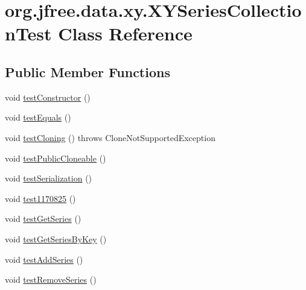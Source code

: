 \hypertarget{classorg_1_1jfree_1_1data_1_1xy_1_1_x_y_series_collection_test}{}\section{org.\+jfree.\+data.\+xy.\+X\+Y\+Series\+Collection\+Test Class Reference}
\label{classorg_1_1jfree_1_1data_1_1xy_1_1_x_y_series_collection_test}
\subsection*{Public Member Functions}
\begin{DoxyCompactItemize}
\item 
void \mbox{\hyperlink{classorg_1_1jfree_1_1data_1_1xy_1_1_x_y_series_collection_test_a3ca59e32d319b7c98e7e7accfaf383a7}{test\+Constructor}} ()
\item 
void \mbox{\hyperlink{classorg_1_1jfree_1_1data_1_1xy_1_1_x_y_series_collection_test_a95a874034015d91ae743b1b2ea6aa3c7}{test\+Equals}} ()
\item 
void \mbox{\hyperlink{classorg_1_1jfree_1_1data_1_1xy_1_1_x_y_series_collection_test_a26423595f11645b7f194d0b79eccaba3}{test\+Cloning}} ()  throws Clone\+Not\+Supported\+Exception 
\item 
void \mbox{\hyperlink{classorg_1_1jfree_1_1data_1_1xy_1_1_x_y_series_collection_test_acefc158c4d96c600cc11ee295ae57373}{test\+Public\+Cloneable}} ()
\item 
void \mbox{\hyperlink{classorg_1_1jfree_1_1data_1_1xy_1_1_x_y_series_collection_test_a5eb634980521d16ede60a61a23de143e}{test\+Serialization}} ()
\item 
void \mbox{\hyperlink{classorg_1_1jfree_1_1data_1_1xy_1_1_x_y_series_collection_test_a6ee0af50b0229c764ca9c54343126d56}{test1170825}} ()
\item 
void \mbox{\hyperlink{classorg_1_1jfree_1_1data_1_1xy_1_1_x_y_series_collection_test_ace859d2f209f46b2aa0998083ed426c5}{test\+Get\+Series}} ()
\item 
void \mbox{\hyperlink{classorg_1_1jfree_1_1data_1_1xy_1_1_x_y_series_collection_test_a0b3fa5d4dea11c24daf31471b1c01d8a}{test\+Get\+Series\+By\+Key}} ()
\item 
void \mbox{\hyperlink{classorg_1_1jfree_1_1data_1_1xy_1_1_x_y_series_collection_test_a0876ac6047c8e723097ff15499d64bfb}{test\+Add\+Series}} ()
\item 
void \mbox{\hyperlink{classorg_1_1jfree_1_1data_1_1xy_1_1_x_y_series_collection_test_ad86f1f673e823ac18caa84cab8b00d75}{test\+Remove\+Series}} ()

\end{DoxyCompactItemize}
